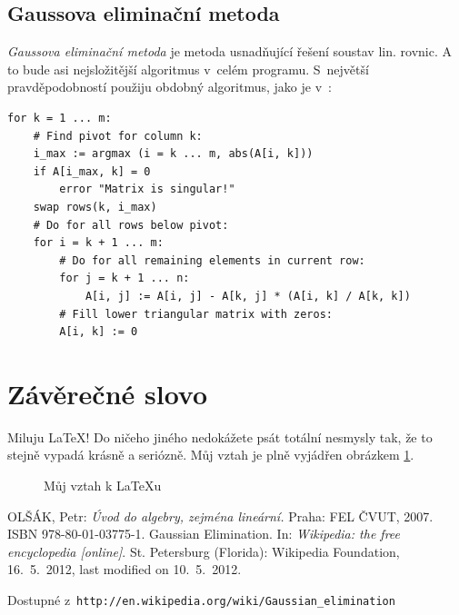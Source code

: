 \documentclass[a4paper,11pt]{article}
\begin{document}
\subsection{Gaussova eliminační metoda}
\emph{Gaussova eliminační metoda} je metoda usnadňující řešení soustav lin. rovnic. \cite{olsak} A to bude asi nejsložitější algoritmus v~celém programu. S~největší pravděpodobností použiju obdobný algoritmus, jako je v~\cite{wiki}:
\begin{verbatim}
for k = 1 ... m:
    # Find pivot for column k:
    i_max := argmax (i = k ... m, abs(A[i, k]))
    if A[i_max, k] = 0
        error "Matrix is singular!"
    swap rows(k, i_max)
    # Do for all rows below pivot:
    for i = k + 1 ... m:
        # Do for all remaining elements in current row:
        for j = k + 1 ... n:
            A[i, j] := A[i, j] - A[k, j] * (A[i, k] / A[k, k])
        # Fill lower triangular matrix with zeros:
        A[i, k] := 0
\end{verbatim}

\section{Závěrečné slovo}
Miluju \LaTeX{}! Do ničeho jiného nedokážete psát totální nesmysly tak, že to stejně vypadá krásně a seriózně. Můj vztah je plně vyjádřen obrázkem \ref{fig:tikz}.

\begin{figure}[h]
\centering
{}
\caption{Můj vztah k \LaTeX{}u}
\label{fig:tikz}
\end{figure}

\begin{thebibliography}{Olšák07}
	OLŠÁK, Petr:
	\emph{Úvod do algebry, zejména lineární.}
	Praha: FEL ČVUT, 2007. ISBN 978-80-01-03775-1.
 Gaussian Elimination. In:
	\emph{Wikipedia: the free encyclopedia [online]}. St. Petersburg (Florida):
	Wikipedia Foundation, 16.~5.~2012, last modified on 10.~5.~2012.
	\par Dostupné z~\verb|http://en.wikipedia.org/wiki/Gaussian_elimination|
\end{thebibliography}
\end{document}
